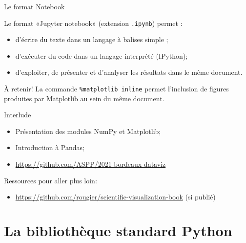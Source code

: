 \documentclass[dvipsnames]{beamer}
\def\interlude{
\plain{Interlude\\[1em]
    \centerline{\decothreeleft\;\rotatebox[origin=c]{180}{\decothreeleft}}
}}
\begin{document}
\begin{frame}
    [fragile]{Le format Notebook}

    Le format «Jupyter notebook» (extension \texttt{.ipynb}) permet :
    \begin{itemize}
        \item d'écrire du texte dans un langage à balises simple ;
        \item d'exécuter du code dans un langage interprété (IPython);
        \item d'exploiter, de présenter et d'analyser les résultats dans le
              même document.
    \end{itemize}

    \begin{alertblock} {À retenir!}
        La commande \texttt{\%matplotlib inline} permet l'inclusion de figures
        produites par Matplotlib au sein du même document.
    \end{alertblock}

\end{frame}

\interlude

\begin{frame}
    [fragile]{Interlude}

    \begin{itemize}
        \item Présentation des modules NumPy et Matplotlib;
        \item Introduction à Pandas;
        \item \url{https://github.com/ASPP/2021-bordeaux-dataviz}
    \end{itemize}

    Ressources pour aller plus loin:
    \begin{itemize}
        \item \url{https://github.com/rougier/scientific-visualization-book} (si publié)
    \end{itemize}

\end{frame}


\section{La bibliothèque standard Python}
\end{document}
